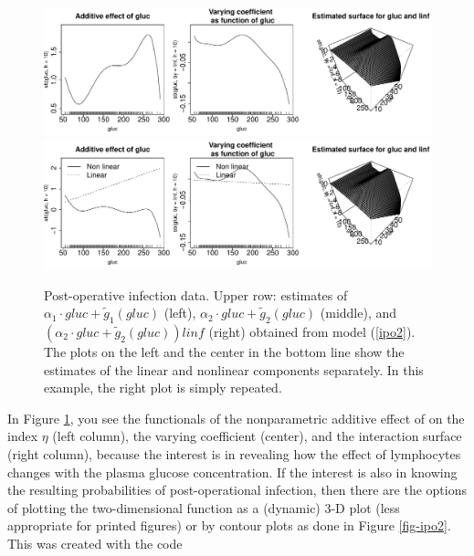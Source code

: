 \begin{figure}[htb]
\centering
\includegraphics[width=1\textwidth]{Infec_Plot_1.pdf}
\includegraphics[width=1\textwidth]{Infec_Plot_2.pdf}
\caption{Post-operative infection data. Upper row: estimates of $\alpha_{1} \cdot gluc + \tilde{g}_1(gluc)$ (left), $\alpha_{2} \cdot gluc + \tilde{g}_2(gluc)$ (middle), and $\left(\alpha_{2} \cdot gluc + \tilde{g}_2(gluc)\right)linf$ (right) obtained from model (\ref{ipo2}). The plots on the left and the center in the bottom line show the estimates of the linear and nonlinear components separately. In this example, the right plot is simply repeated.\label{fig-ipo}}
\end{figure}

In Figure \ref{fig-ipo}, you see the functionals of the nonparametric additive effect of   on the index $\eta$
(left column), the varying coefficient (center), and the interaction surface (right column), because the interest is in revealing how the effect of lymphocytes changes with the plasma glucose concentration. If the interest is also in knowing the resulting probabilities of post-operational infection, then there are the options of plotting the two-dimensional function as a (dynamic) 3-D plot (less appropriate for printed figures) or by contour plots as done in Figure \ref{fig-ipo2}. This was created with the code  

\begin{Schunk}
\end{Schunk}
 
